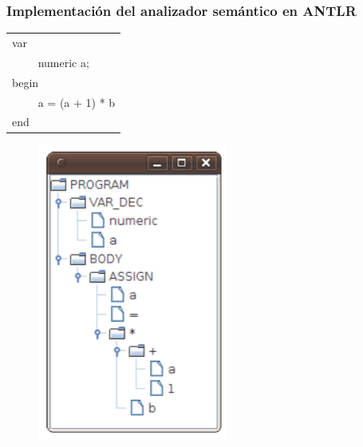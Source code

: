 \documentclass{beamer}
\begin{document}
		\begin{frame}
			\frametitle{Implementaci\'on del analizador sem\'antico en ANTLR}
			
			\begin{multicols}{2}
			    \begin{table}[H]
			        \begin{center}
			            \begin{tabular}{l}
			                var \\
			                ~~~~ numeric a; \\
			                begin \\
			                ~~~~ a = (a + 1) * b \\
			                end \\
			            \end{tabular}
			        \end{center}
			    \end{table}
			    \begin{figure}[H]
			    \begin{center}
			        \includegraphics[scale=.55]{images/ast.png}
			    \end{center}
			\end{figure}
			\end{multicols}
	    \end{frame}
	    
\end{document}
